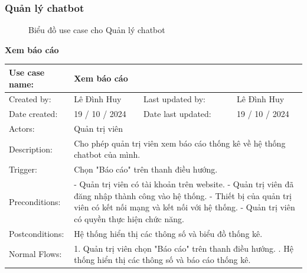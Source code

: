 \subsubsection{Quản lý chatbot}
\begin{figure}[H]
    \centering
    
    \vspace{0.5cm}
    \caption{Biểu đồ use case cho Quản lý chatbot}
    \label{fig:enter-label}
\end{figure}
\textbf{Xem báo cáo}
\begin{table}[H]
    \centering
    \begin{tabular}{|l|l|l|l|} 
        \hline
        Use case name: & \multicolumn{3}{|l|}{Xem báo cáo} \\
        \hline
        Created by: & Lê Đình Huy & Last updated by: & Lê Đình Huy \\
        \hline
        Date created: & 19 / 10 / 2024 & Date last updated: & 19 / 10 / 2024 \\
        \hline
        Actors: & \multicolumn{3}{|l|}{Quản trị viên} \\
        \hline
        Description: & \multicolumn{3}{|p{12cm}|}{Cho phép quản trị viên xem báo cáo thống kê về hệ thống chatbot của mình.} \\ 
        \hline
        Trigger: & \multicolumn{3}{|p{12cm}|}{Chọn "Báo cáo" trên thanh điều hướng.} \\
        \hline
        Preconditions: & \multicolumn{3}{|p{12cm}|}{- Quản trị viên có tài khoản trên website. \newline
        - Quản trị viên đã đăng nhập thành công vào hệ thống. \newline
        - Thiết bị của quản trị viên có kết nối mạng và kết nối với hệ thống. \newline
        - Quản trị viên có quyền thực hiện chức năng.} \\
        \hline
        Postconditions: & \multicolumn{3}{|p{12cm}|}{Hệ thống hiển thị các thông số và biểu đồ thống kê.} \\
        \hline
        Normal Flows: & \multicolumn{3}{|p{12cm}|}{1. Quản trị viên chọn "Báo cáo" trên thanh điều hướng. \newline
        2. Hệ thống hiển thị các thông số và báo cáo thống kê.}\\

\end{tabular}
\end{table}
